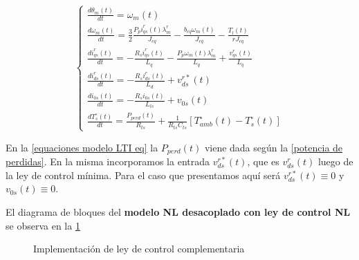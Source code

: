 \documentclass[a4paper, 10pt, onecolumn,journal]{ieeeconf}
\begin{document}
\begin{equation}
	\begin{cases}
		\frac{d \theta_m(t)}{dt} = {\omega}_m(t)\\
		\frac{d \omega_m(t)}{dt} = \frac{3}{2} \frac{P_p i^r_{qs}(t)\lambda^r_m}{J_{eq}} - \frac{b_{eq}\omega_m(t)}{J_{eq}} - \frac{T_l(t)}{r J_{eq}}\\
		\frac{d i^r_{qs}(t)}{dt} = -\frac{R_s i^r_{qs}(t)}{L_q} - \frac{P_p \omega_m(t) \lambda^r_m}{L_q}+ \frac{v^r_{qs}(t)}{L_q}\\
		\frac{d i^r_{ds}(t)}{dt} = -\frac{R_s i^r_{ds}(t)}{L_d}	+ v^{r*}_{ds}(t)\\
		\frac{d i_{0s}(t)}{dt} = -\frac{R_s i_{0s}(t)}{L_{ls}}	+ v_{0s}(t)\\
		\frac{d T^\circ_{s}(t)}{dt} = \frac{P_{perd}(t)}{R_{ts}} + \frac{1}{R_{ts}C_{ts}}\left[T^{\circ}_{amb}(t) - T_{s}^{\circ}(t)\right]
	\end{cases}
	\label{equaciones modelo LTI eq}
\end{equation}

En la \cref{equaciones modelo LTI eq} la $P_{perd}(t)$ viene dada según la \cref{potencia de perdidas}. En la misma incorporamos la entrada $v^{r*}_{ds}(t)$, que es $v^r_{ds}(t)$ luego de
la ley de control mínima. Para el caso que presentamos aquí será $v^{r*}_{ds}(t) \equiv 0$ y $v_{0s}(t) \equiv0 $.


El diagrama de bloques del \textbf{modelo NL desacoplado con ley de control NL} se observa en la \cref{Implementación de ley de control complementaria}

\begin{figure}[thpb]
	\centering
	\begin{adjustbox}{max width=\columnwidth}
	\end{adjustbox}
	\caption{Implementación de ley de control complementaria}
	\label{Implementación de ley de control complementaria}
\end{figure}
\end{document}
